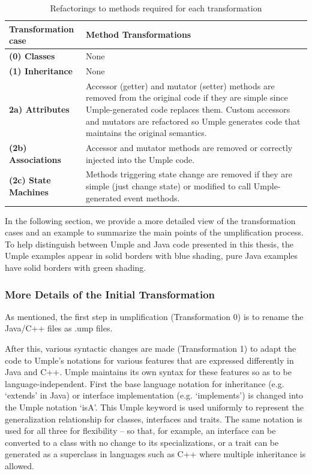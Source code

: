 \begin{table}[htbp]
	\caption{Refactorings to methods required for each transformation}
	\label{table:transformations}
    \centering
    \begin{tabular}{ l | p{9cm} }
        \toprule
        \rowcolor[HTML]{BBDAFF}
       \textbf{ Transformation case  }   & \textbf{Method Transformations}
        \\ \midrule
        \textbf{(0)  Classes }        & None      \\ \hline
        \textbf{(1)  Inheritance}     & None       \\ \hline
        \textbf{2a)  Attributes}      & 
        Accessor (getter) and mutator (setter) methods are removed from the original code if they are simple since 		Umple-generated code replaces them. Custom accessors and mutators are refactored so Umple generates code 			that maintains the original
        semantics.         		\\ \hline
        \textbf{(2b) Associations }   & 
 		Accessor and mutator methods are removed or correctly injected into the Umple code.        
		\\ \hline
        \textbf{(2c) State Machines  }  & 
		Methods triggering state change are removed if they are simple (just change state) or modified to call 				Umple-generated event methods.  	
		\\ \bottomrule
    \end{tabular}
\end{table}

In the following section, we provide a more detailed view of the transformation cases and an example to summarize the main points of the umplification process. To help distinguish between Umple and Java code presented in this thesis, the Umple examples appear in solid borders with blue shading, pure Java examples have solid borders with green shading. 

\subsubsection{More Details of the Initial Transformation}

As mentioned, the first step in umplification (Transformation 0) is to rename the Java/C++ files as .ump files.

After this, various syntactic changes are made (Transformation 1) to adapt the code to Umple's notations for various features that are expressed differently in Java and C++. Umple maintains its own syntax for these features so as to be language-independent.
First the base language notation for inheritance (e.g. `extends' in Java) or interface implementation (e.g. `implements') is changed into the Umple notation `isA'. This Umple keyword is used uniformly to represent the generalization relationship for classes, interfaces and traits. The same notation is used for all three for flexibility -- so that, for example, an interface can be converted to a class with no change to its specializations, or a trait can be generated as a superclass in languages such as C++ where multiple inheritance is allowed.

